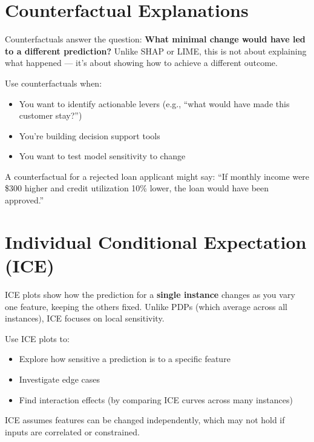 \documentclass[12pt,openany]{book}
\begin{document}
\section{Counterfactual Explanations}

Counterfactuals answer the question: \textbf{What minimal change would have led to a different prediction?} Unlike SHAP or LIME, this is not about explaining what happened — it’s about showing how to achieve a different outcome.

Use counterfactuals when:
\begin{itemize}
  \item You want to identify actionable levers (e.g., ``what would have made this customer stay?'')
  \item You're building decision support tools
  \item You want to test model sensitivity to change
\end{itemize}

\begin{examplebox}
A counterfactual for a rejected loan applicant might say: ``If monthly income were \$300 higher and credit utilization 10\% lower, the loan would have been approved.''
\end{examplebox}



\section{Individual Conditional Expectation (ICE)}

ICE plots show how the prediction for a \textbf{single instance} changes as you vary one feature, keeping the others fixed. Unlike PDPs (which average across all instances), ICE focuses on local sensitivity.

Use ICE plots to:
\begin{itemize}
  \item Explore how sensitive a prediction is to a specific feature
  \item Investigate edge cases
  \item Find interaction effects (by comparing ICE curves across many instances)
\end{itemize}

\noindent\begin{minipage}{\textwidth}
\begin{notebox}
ICE assumes features can be changed independently, which may not hold if inputs are correlated or constrained.
\end{notebox}
\end{minipage}
\end{document}
